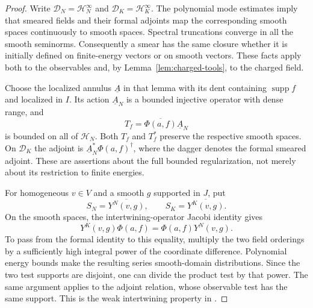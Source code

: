 \begin{proof}
Write $\mathcal D_N=\mathcal H_N^\infty$ and
$\mathcal D_K=\mathcal H_K^\infty$.
The polynomial mode estimates imply that smeared fields and their formal
adjoints map the corresponding smooth spaces continuously to smooth
spaces.  Spectral truncations converge in all the smooth seminorms.
Consequently a smear has the same closure whether it is initially
defined on finite-energy vectors or on smooth vectors.  These facts
apply both to the observables and, by Lemma~\ref{lem:charged-tools},
to the charged field.

Choose the localized annulus $\underline A$ in that lemma with its dent
containing $\operatorname{supp}f$ and localized in $I$.
Its action $\underline A_N$ is a
bounded injective operator with dense range, and
\begin{equation}
 T_f=\overline{\Phi(a,f)}\underline A_N
 \label{eq:bounded-charge-regularization}
\end{equation}
is bounded on all of $\mathcal H_N$.  Both $T_f$ and $T_f^*$ preserve
the respective smooth spaces.  On $\mathcal D_K$ the adjoint is
$\underline A_N^*\Phi(a,f)^\dagger$, where the dagger denotes the formal smeared
adjoint.  These are assertions about the full bounded regularization,
not merely about its restriction to finite energies.

For homogeneous $v\in V$ and a smooth $g$ supported in $J$, put
\[
 S_N=\overline{Y^N(v,g)},\qquad
 S_K=\overline{Y^K(v,g)}.
\]
On the smooth spaces, the intertwining-operator Jacobi identity gives
\[
 Y^K(v,g)\Phi(a,f)=\Phi(a,f)Y^N(v,g).
\]
To pass from the formal identity to this equality, multiply the two
field orderings by a sufficiently high integral power of the coordinate
difference.  Polynomial energy bounds make the resulting series
smooth-domain distributions.  Since the two test supports are
disjoint, one can divide the product test by that power.  The same
argument applies to the adjoint relation, whose observable test has
the same support.  This is the weak intertwining property in
\cite[Theorem~3.5]{GuiUnbounded}.


\end{proof}
